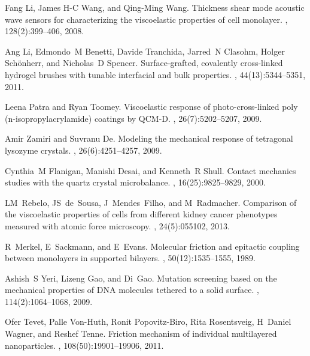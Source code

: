 \documentclass[floatfix,superscriptaddress,a4paper,twocolumn]{revtex4-1}
\begin{document}
\begin{thebibliography}{10}
  Fang Li, James H-C Wang, and Qing-Ming Wang.
  \newblock Thickness shear mode acoustic wave sensors for characterizing the
  viscoelastic properties of cell monolayer.
  , 128(2):399--406, 2008.

  Ang Li, Edmondo~M Benetti, Davide Tranchida, Jarred~N Clasohm, Holger
  Sch{\"o}nherr, and Nicholas~D Spencer.
  \newblock Surface-grafted, covalently cross-linked hydrogel brushes with
  tunable interfacial and bulk properties.
  , 44(13):5344--5351, 2011.

  Leena Patra and Ryan Toomey.
  \newblock Viscoelastic response of photo-cross-linked poly
  (n-isopropylacrylamide) coatings by {QCM-D}.
  , 26(7):5202--5207, 2009.

  Amir Zamiri and Suvranu De.
  \newblock Modeling the mechanical response of tetragonal lysozyme crystals.
  , 26(6):4251--4257, 2009.

  Cynthia~M Flanigan, Manishi Desai, and Kenneth~R Shull.
  \newblock Contact mechanics studies with the quartz crystal microbalance.
  , 16(25):9825--9829, 2000.

  LM~Rebelo, JS~de~Sousa, J~Mendes~Filho, and M~Radmacher.
  \newblock Comparison of the viscoelastic properties of cells from different
  kidney cancer phenotypes measured with atomic force microscopy.
  , 24(5):055102, 2013.

  R~Merkel, E~Sackmann, and E~Evans.
  \newblock Molecular friction and epitactic coupling between monolayers in
  supported bilayers.
  , 50(12):1535--1555, 1989.

  Ashish~S Yeri, Lizeng Gao, and Di~Gao.
  \newblock Mutation screening based on the mechanical properties of {DNA}
  molecules tethered to a solid surface.
  , 114(2):1064--1068, 2009.

  Ofer Tevet, Palle Von-Huth, Ronit Popovitz-Biro, Rita Rosentsveig, H~Daniel
  Wagner, and Reshef Tenne.
  \newblock Friction mechanism of individual multilayered nanoparticles.
  ,
  108(50):19901--19906, 2011.


\end{thebibliography}
\end{document}
